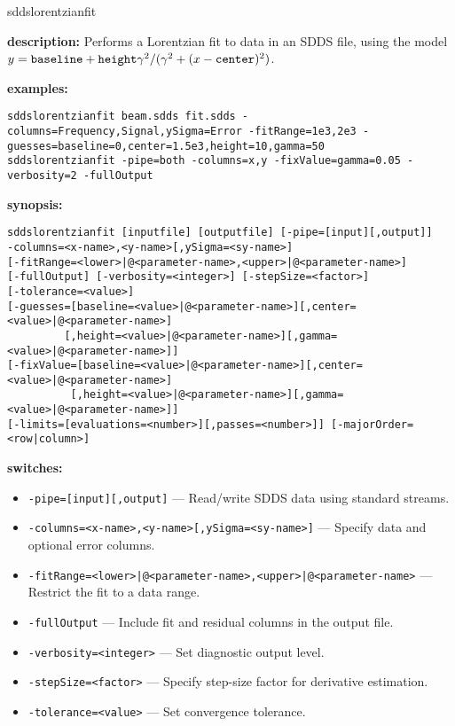 %
\begin{sddsprog}{sddslorentzianfit}
  \item \textbf{description:}
  Performs a Lorentzian fit to data in an SDDS file, using the model
  $y = \verb|baseline| + \verb|height| \gamma^2/(\gamma^2 + (x - \verb|center|)^2)$.
  \item \textbf{examples:}
    \begin{verbatim}
sddslorentzianfit beam.sdds fit.sdds -columns=Frequency,Signal,ySigma=Error -fitRange=1e3,2e3 -guesses=baseline=0,center=1.5e3,height=10,gamma=50
sddslorentzianfit -pipe=both -columns=x,y -fixValue=gamma=0.05 -verbosity=2 -fullOutput
    \end{verbatim}
  \item \textbf{synopsis:}
    \begin{verbatim}
sddslorentzianfit [inputfile] [outputfile] [-pipe=[input][,output]]
-columns=<x-name>,<y-name>[,ySigma=<sy-name>]
[-fitRange=<lower>|@<parameter-name>,<upper>|@<parameter-name>]
[-fullOutput] [-verbosity=<integer>] [-stepSize=<factor>]
[-tolerance=<value>]
[-guesses=[baseline=<value>|@<parameter-name>][,center=<value>|@<parameter-name>]
         [,height=<value>|@<parameter-name>][,gamma=<value>|@<parameter-name>]]
[-fixValue=[baseline=<value>|@<parameter-name>][,center=<value>|@<parameter-name>]
          [,height=<value>|@<parameter-name>][,gamma=<value>|@<parameter-name>]]
[-limits=[evaluations=<number>][,passes=<number>]] [-majorOrder=<row|column>]
    \end{verbatim}
  \item \textbf{switches:}
    \begin{itemize}
      \item \verb|-pipe=[input][,output]| --- Read/write SDDS data using standard streams.
      \item \verb|-columns=<x-name>,<y-name>[,ySigma=<sy-name>]| --- Specify data and optional error columns.
      \item \verb!-fitRange=<lower>|@<parameter-name>,<upper>|@<parameter-name>! --- Restrict the fit to a data range.
      \item \verb|-fullOutput| --- Include fit and residual columns in the output file.
      \item \verb|-verbosity=<integer>| --- Set diagnostic output level.
      \item \verb|-stepSize=<factor>| --- Specify step-size factor for derivative estimation.
      \item \verb|-tolerance=<value>| --- Set convergence tolerance.

\end{itemize}
\end{sddsprog}
